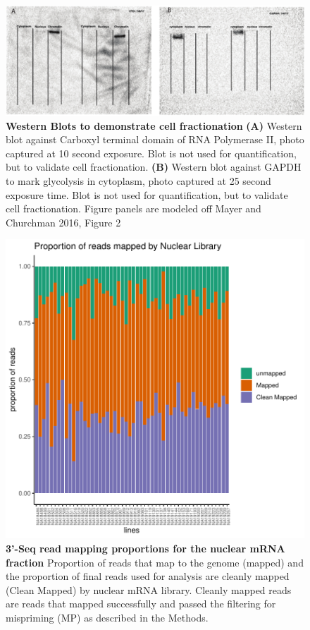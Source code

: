 \begin{figure}[!htb]
\centering
\includegraphics[width=5in]{img/ch02/Fig1_figuresupplement7.pdf}
\caption[Western Blots to demonstrate cell fractionation]{\textbf{Western Blots to demonstrate cell fractionation} {\bf (A)} Western blot against Carboxyl terminal domain of RNA Polymerase II, photo captured at 10 second exposure. Blot is not used for quantification, but to validate cell fractionation. {\bf (B)} Western blot against GAPDH to mark glycolysis in cytoplasm, photo captured at 25 second exposure time. Blot is not used for quantification, but to validate cell fractionation. Figure panels are modeled off Mayer and Churchman 2016, Figure 2 \citep{mayer_genome-wide_2016}}
\label{fig:western}
\end{figure}
\clearpage

\begin{figure}[!htb]
\centering
\includegraphics[width=5in]{img/ch02/Fig1_figuresupplement8.pdf}
\caption[3'-Seq read mapping proportions for the nuclear mRNA fraction]{\textbf{3'-Seq read mapping proportions for the nuclear mRNA fraction} Proportion of reads that map to the genome (mapped) and the proportion of final reads used for analysis are cleanly mapped (Clean Mapped) by nuclear mRNA library. Cleanly mapped reads are reads that mapped successfully and passed the filtering for mispriming (MP) as described in the Methods.}
\label{fig:nucMap}
\end{figure}
\clearpage

